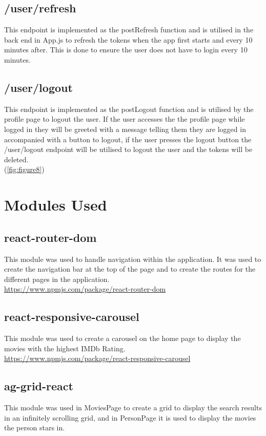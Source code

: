 \documentclass[12pt,a4paper]{article}
\begin{document}
		\subsection{/user/refresh}
			This endpoint is implemented as the postRefresh function and is utilised in the back end 
			in App.js to refresh the tokens when the app first starts and every 10 minutes after. 
			This is done to ensure the user does not have to login every 10 minutes.
		
		\subsection{/user/logout}
			This endpoint is implemented as the postLogout function and is utilised by the profile 
			page to logout the user. If the user accesses the the profile page while logged in they 
			will be greeted with a message telling them they are logged in accompanied with a button 
			to logout, if the user presses the logout button the /user/logout endpoint will be utilised 
			to logout the user and the tokens will be deleted.\\
			(\cref{fig:figure8})

	\section{Modules Used}
		\subsection{react-router-dom}
			This module was used to handle navigation within the application. It was used to create 
			the navigation bar at the top of the page and to create the routes for the different 
			pages in the application.\\

			\href{https://www.npmjs.com/package/react-router-dom}{https://www.npmjs.com/package/react-router-dom}
		
		\subsection{react-responsive-carousel}
			This module was used to create a carousel on the home page to display the movies with the 
			highest IMDb Rating.\\

			\href{https://www.npmjs.com/package/react-responsive-carousel}{https://www.npmjs.com/package/react-responsive-carousel}
		
		\subsection{ag-grid-react}
			This module was used in MoviesPage to create a grid to display the search results in an infinitely 
			scrolling grid, and in PersonPage it is used to display the movies the person stars in.\\
\end{document}
